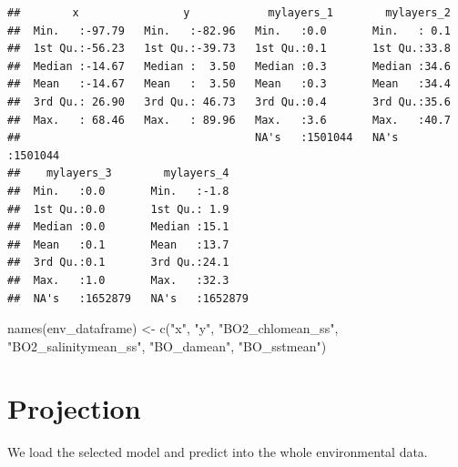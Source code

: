\documentclass[
]{book}
\newenvironment{Shaded}{\begin{snugshade}}{\end{snugshade}}
\newcommand{\AttributeTok}[1]{\textcolor[rgb]{0.77,0.63,0.00}{#1}}
\newcommand{\CommentTok}[1]{\textcolor[rgb]{0.56,0.35,0.01}{\textit{#1}}}
\newcommand{\FunctionTok}[1]{\textcolor[rgb]{0.00,0.00,0.00}{#1}}
\newcommand{\NormalTok}[1]{#1}
\newcommand{\OtherTok}[1]{\textcolor[rgb]{0.56,0.35,0.01}{#1}}
\newcommand{\SpecialCharTok}[1]{\textcolor[rgb]{0.00,0.00,0.00}{#1}}
\newcommand{\StringTok}[1]{\textcolor[rgb]{0.31,0.60,0.02}{#1}}
\begin{document}
\begin{verbatim}
##        x                y            mylayers_1        mylayers_2     
##  Min.   :-97.79   Min.   :-82.96   Min.   :0.0       Min.   : 0.1     
##  1st Qu.:-56.23   1st Qu.:-39.73   1st Qu.:0.1       1st Qu.:33.8     
##  Median :-14.67   Median :  3.50   Median :0.3       Median :34.6     
##  Mean   :-14.67   Mean   :  3.50   Mean   :0.3       Mean   :34.4     
##  3rd Qu.: 26.90   3rd Qu.: 46.73   3rd Qu.:0.4       3rd Qu.:35.6     
##  Max.   : 68.46   Max.   : 89.96   Max.   :3.6       Max.   :40.7     
##                                    NA's   :1501044   NA's   :1501044  
##    mylayers_3        mylayers_4     
##  Min.   :0.0       Min.   :-1.8     
##  1st Qu.:0.0       1st Qu.: 1.9     
##  Median :0.0       Median :15.1     
##  Mean   :0.1       Mean   :13.7     
##  3rd Qu.:0.1       3rd Qu.:24.1     
##  Max.   :1.0       Max.   :32.3     
##  NA's   :1652879   NA's   :1652879
\end{verbatim}

\begin{Shaded}
\begin{Highlighting}[]
\FunctionTok{names}\NormalTok{(env\_dataframe) }\OtherTok{\textless{}{-}} \FunctionTok{c}\NormalTok{(}\StringTok{"x"}\NormalTok{, }\StringTok{"y"}\NormalTok{, }\StringTok{"BO2\_chlomean\_ss"}\NormalTok{, }\StringTok{"BO2\_salinitymean\_ss"}\NormalTok{, }\StringTok{"BO\_damean"}\NormalTok{, }\StringTok{"BO\_sstmean"}\NormalTok{)}
\end{Highlighting}
\end{Shaded}

\hypertarget{projection}{%
\section{Projection}\label{projection}}

We load the selected model and predict into the whole environmental data.

\begin{Shaded}
\end{Shaded}
\end{document}
